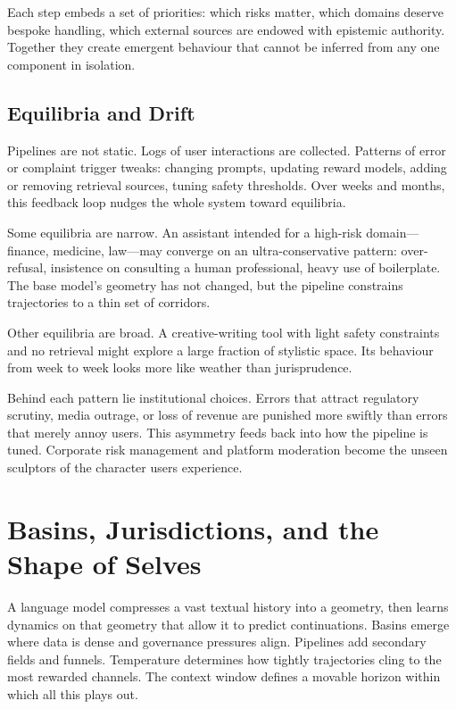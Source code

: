 \documentclass[12pt,a4paper]{article}
\begin{document}
Each step embeds a set of priorities: which risks matter, which domains deserve bespoke handling, which external sources are endowed with epistemic authority. Together they create emergent behaviour that cannot be inferred from any one component in isolation.

\subsection{Equilibria and Drift}

Pipelines are not static. Logs of user interactions are collected. Patterns of error or complaint trigger tweaks: changing prompts, updating reward models, adding or removing retrieval sources, tuning safety thresholds. Over weeks and months, this feedback loop nudges the whole system toward equilibria.

Some equilibria are narrow. An assistant intended for a high-risk domain---finance, medicine, law---may converge on an ultra-conservative pattern: over-refusal, insistence on consulting a human professional, heavy use of boilerplate. The base model's geometry has not changed, but the pipeline constrains trajectories to a thin set of corridors.

Other equilibria are broad. A creative-writing tool with light safety constraints and no retrieval might explore a large fraction of stylistic space. Its behaviour from week to week looks more like weather than jurisprudence.

Behind each pattern lie institutional choices. Errors that attract regulatory scrutiny, media outrage, or loss of revenue are punished more swiftly than errors that merely annoy users. This asymmetry feeds back into how the pipeline is tuned. Corporate risk management and platform moderation become the unseen sculptors of the character users experience.

\section{Basins, Jurisdictions, and the Shape of Selves}

A language model compresses a vast textual history into a geometry, then learns dynamics on that geometry that allow it to predict continuations. Basins emerge where data is dense and governance pressures align. Pipelines add secondary fields and funnels. Temperature determines how tightly trajectories cling to the most rewarded channels. The context window defines a movable horizon within which all this plays out.
\end{document}
